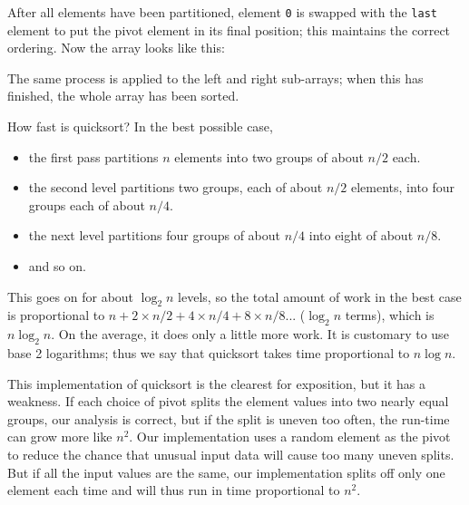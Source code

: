 After all elements have been partitioned, element \verb'0' is swapped with
the \verb'last' element to put the pivot element in its final position;
this maintains the correct ordering. Now the array looks like this: \\
\begin{center}
\end{center}

The same process is applied to the left and right sub-arrays; when this has
finished, the whole array has been sorted.

How fast is quicksort? In the best possible case,
\begin{itemize}
\item the first pass partitions $n$ elements into two groups of about $n/2$
    each.
\item the second level partitions two groups, each of about $n/2$ elements,
    into four groups each of about $n/4$.
\item the next level partitions four groups of about $n/4$ into eight of
    about $n/8$.
\item and so on.
\end{itemize}

This goes on for about $\log_2 n$ levels, so the total amount of work in
the best case is proportional to $n + 2\times n/2 + 4\times n/4 + 8\times
n/8 ... $ ($\log_2 n$ terms), which is $n\log_2 n$. On the average, it does
only a little more work. It is customary to use base 2 logarithms; thus we
say that quicksort takes time proportional to $n\log n$.

This implementation of quicksort is the clearest for exposition, but it has
a weakness. If each choice of pivot splits the element values into two
nearly equal groups, our analysis is correct, but if the split is uneven
too often, the run-time can grow more like $n^2$. Our implementation uses a
random element as the pivot to reduce the chance that unusual input data
will cause too many uneven splits. But if all the input values are the
same, our implementation splits off only one element each time and will
thus run in time proportional to $n^2$.

